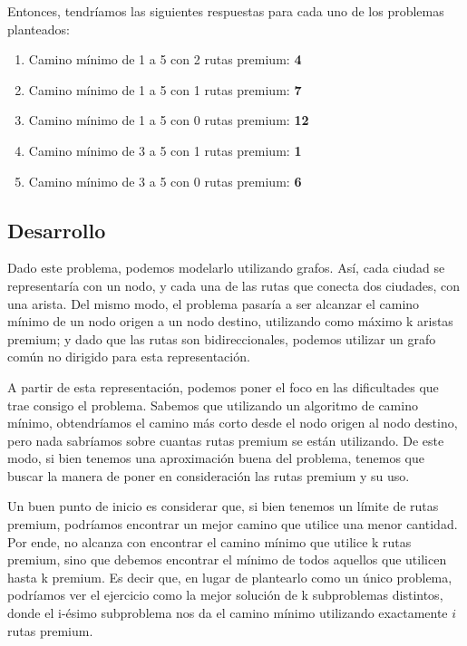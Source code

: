 \bigskip

Entonces, tendríamos las siguientes respuestas para cada uno de los problemas planteados:

\begin{enumerate}
	\item Camino mínimo de 1 a 5 con 2 rutas premium: \textbf{4}

	\item Camino mínimo de 1 a 5 con 1 rutas premium: \textbf{7}
	
	\item Camino mínimo de 1 a 5 con 0 rutas premium: \textbf{12}
	
	\item Camino mínimo de 3 a 5 con 1 rutas premium: \textbf{1}
	
	\item Camino mínimo de 3 a 5 con 0 rutas premium: \textbf{6}
\end{enumerate}

\subsection{Desarrollo}
Dado este problema, podemos modelarlo utilizando grafos. Así, cada ciudad se representaría con un nodo, y cada una de las rutas que conecta dos ciudades, con una arista. Del mismo modo, el problema pasaría a ser alcanzar el camino mínimo de un nodo origen a un nodo destino, utilizando como máximo k aristas premium; y dado que las rutas son bidireccionales, podemos utilizar un grafo común no dirigido para esta representación.

A partir de esta representación, podemos poner el foco en las dificultades que trae consigo el problema. Sabemos que utilizando un algoritmo de camino mínimo, obtendríamos el camino más corto desde el nodo origen al nodo destino, pero nada sabríamos sobre cuantas rutas premium se están utilizando. De este modo, si bien tenemos una aproximación buena del problema, tenemos que buscar la manera de poner en consideración las rutas premium y su uso. 

Un buen punto de inicio es considerar que, si bien tenemos un límite de rutas premium, podríamos encontrar un mejor camino que utilice una menor cantidad. Por ende, no alcanza con encontrar el camino mínimo que utilice k rutas premium, sino que debemos encontrar el mínimo de todos aquellos que utilicen hasta k premium. Es decir que, en lugar de plantearlo como un único problema, podríamos ver el ejercicio como la mejor solución de k subproblemas distintos, donde el i-ésimo subproblema nos da el camino mínimo utilizando exactamente $i$ rutas premium.

